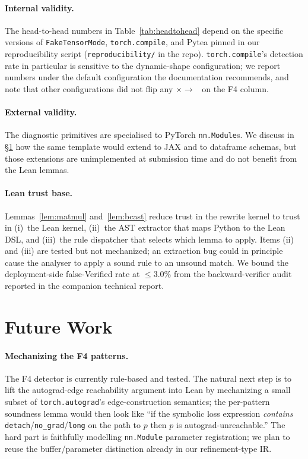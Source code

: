 \documentclass{article}
\begin{document}
\paragraph{Internal validity.} The head-to-head numbers in
Table~\ref{tab:headtohead} depend on the specific versions of
\texttt{FakeTensorMode}, \texttt{torch.compile}, and Pytea pinned
in our reproducibility script (\texttt{reproducibility/} in the
repo). \texttt{torch.compile}'s detection rate in particular is
sensitive to the dynamic-shape configuration; we report numbers
under the default configuration the documentation recommends, and
note that other configurations did not flip any
$\times \to$~\checkmark{} on the F4 column.

\paragraph{External validity.} The diagnostic primitives are
specialised to PyTorch \texttt{nn.Module}s. We discuss in
\S\ref{sec:future} how the same template would extend to JAX and
to dataframe schemas, but those extensions are unimplemented at
submission time and do not benefit from the Lean lemmas.

\paragraph{Lean trust base.} Lemmas~\ref{lem:matmul}
and~\ref{lem:bcast} reduce trust in the rewrite kernel to trust
in (i)~the Lean kernel, (ii)~the AST extractor that maps Python
to the Lean DSL, and (iii)~the rule dispatcher that selects
which lemma to apply. Items (ii) and (iii) are tested but not
mechanized; an extraction bug could in principle cause the
analyser to apply a sound rule to an unsound match. We bound
the deployment-side false-Verified rate at $\le 3.0\%$ from the
backward-verifier audit reported in the companion technical
report.

\section{Future Work}
\label{sec:future}

\paragraph{Mechanizing the F4 patterns.} The F4 detector is
currently rule-based and tested. The natural next step is to
lift the autograd-edge reachability argument into Lean by
mechanizing a small subset of \texttt{torch.autograd}'s
edge-construction semantics; the per-pattern soundness lemma
would then look like ``if the symbolic loss expression
\emph{contains} \texttt{detach}/\texttt{no\_grad}/\texttt{long}
on the path to $p$ then $p$ is autograd-unreachable.''
The hard part is faithfully modelling \texttt{nn.Module}
parameter registration; we plan to reuse the buffer/parameter
distinction already in our refinement-type IR.
\end{document}
